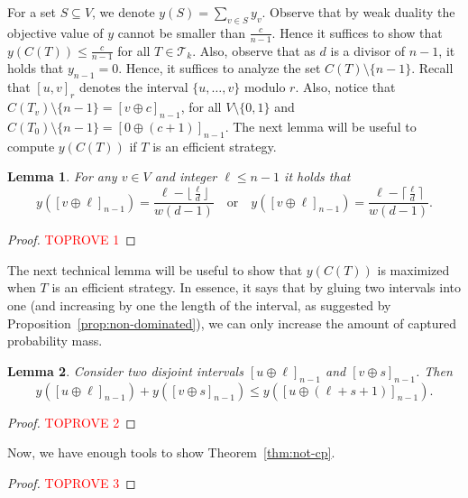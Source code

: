 \documentclass[11pt]{article}
\newtheorem{lemma}{Lemma}[section]
\newcommand\+{\mkern2mu}
\newcommand{\T}{T}
\begin{document}
For a set $S\subseteq V$, we denote $y(S)=\sum_{v\in S}y_v$. Observe that by weak duality the objective value of $y$ cannot be smaller than $\frac{c}{n-1}$. Hence it suffices to show that $y(C(T))\le \frac{c}{n-1}$ for all $T\in \mathcal{T}_k$. Also, observe that as $d$ is a divisor of $n-1$, it holds that $y_{n-1}=0$. Hence, it suffices to analyze the set $C(\T)\setminus\{n-1\}$. Recall that $[u,v]_r$ denotes the interval $\{u,\ldots,v\}$ modulo $r$. Also, notice that $C(\T_v)\setminus \{n-1\} = [v\oplus c]_{n-1}$, for all $V\setminus\{0,1\}$ and $C(\T_0)\setminus \{n-1\}=[0\oplus (c+1)]_{n-1}$. 
The next lemma will be useful to compute $y(C(\T))$ if $\T$ is an efficient strategy. 

\begin{lemma}\label{lm:yshift}
    For any $v\in V$ and integer $\ell\le n-1$ it holds that 
    $$  y([v\oplus\ell]_{n-1}) = \frac{\ell-\lfloor \frac{\ell}{d}\rfloor}{w(d-1)}\quad\text{or}\quad y([v\oplus \ell]_{n-1}) = \frac{\ell-\lceil \frac{\ell}{d}\rceil}{w(d-1)}. $$
\end{lemma}
\begin{proof}\textcolor{red}{TOPROVE 1}\end{proof}

The next technical lemma will be useful to show that  $y(C(\T))$ is maximized when $\T$ is an efficient strategy. In essence, it says that by gluing two intervals into one (and increasing by one the length of the interval, as suggested by Proposition~\ref{prop:non-dominated}), we can only increase the amount of captured probability mass.

\begin{lemma}\label{lm:ymerge}
Consider two disjoint intervals $[u\oplus\ell]_{n-1}$ and $[v\oplus s]_{n-1}$. Then 
$$y([u\oplus \ell]_{n-1})+y([v\oplus s]_{n-1})\le y([u\oplus (\ell+s+1)]_{n-1}).$$
\end{lemma}
\begin{proof}\textcolor{red}{TOPROVE 2}\end{proof}

Now, we have enough tools to show Theorem~\ref{thm:not-cp}. 

\begin{proof}\textcolor{red}{TOPROVE 3}\end{proof}
\end{document}
